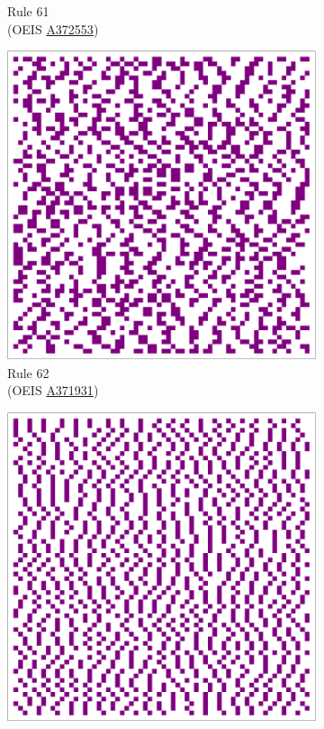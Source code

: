 \documentclass{article}
\begin{document}
\begin{figure}[H]
\begin{subfigure}[b]{0.24\textwidth}
        \caption*{Rule 61\\(OEIS \href{https://oeis.org/A372553}{A372553})}
        \label{fig:rule-61-center_column_plot-4096}
    \end{subfigure}
    \begin{subfigure}[b]{0.24\textwidth}
        \centering
        \includegraphics[width=.9\textwidth]{graphics/behavior/center-columns/rule-62-center_column_plot-4096.pdf}
        \caption*{Rule 62\\(OEIS \href{https://oeis.org/A371931}{A371931})}
        \label{fig:rule-62-center_column_plot-4096}
    \end{subfigure}
    \begin{subfigure}[b]{0.24\textwidth}
        \centering
        \includegraphics[width=.9\textwidth]{graphics/behavior/center-columns/rule-94-center_column_plot-4096.pdf}

\end{subfigure}
\end{figure}
\end{document}
